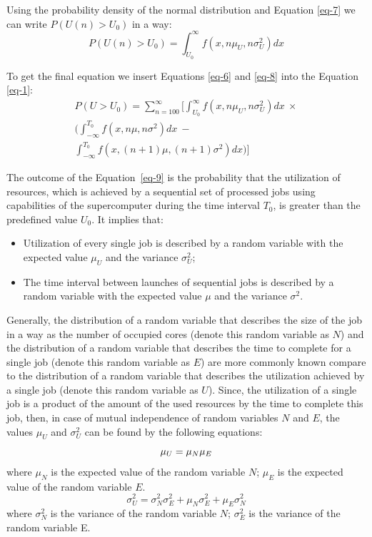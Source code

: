 Using the probability density of the normal distribution and Equation \ref{eq-7} we can write $P(U(n) > U_0)$ in a way:
\begin{equation}
    \label{eq-8}
    P(U(n) > U_0) = \int_{U_0}^{\infty}f(x, n\mu_{U}, n\sigma_{U}^2)dx
\end{equation}

To get the final equation we insert Equations \ref{eq-6} and \ref{eq-8} into the Equation \ref{eq-1}:
\begin{equation}
    \label{eq-9}
    \begin{multlined}
    P(U > U_0) = \sum\limits_{n=100}^{\infty} 
                 \bigg[ \int_{U_0}^{\infty}f(x, n\mu_{U}, n\sigma_{U}^2)dx \  \times \\
                 \bigg( \int_{-\infty}^{T_0}f(x, n\mu, n\sigma^2)dx \  - \\
                 \int_{-\infty}^{T_0}f(x, (n+1)\mu, (n+1)\sigma^2)dx \bigg) \bigg]
    \end{multlined}
\end{equation}

The outcome of the Equation~\ref{eq-9} is the probability that the utilization of resources, which is achieved by a sequential set of processed jobs using capabilities of the supercomputer during the time interval $T_0$, is greater than the predefined value $U_0$. It implies that:
\begin{itemize}
	\item Utilization of every single job is described by a random variable with the expected value $\mu_{U}$ and the variance $\sigma_{U}^2$;
	\item The time interval between launches of sequential jobs is described by a random variable with the expected value $\mu$ and the variance $\sigma^2$.
\end{itemize}

Generally, the distribution of a random variable that describes the size of the job in a way as the number of occupied cores (denote this random variable as $N$) and the distribution of a random variable that describes the time to complete for a single job (denote this random variable as $E$) are more commonly known compare to the distribution of a random variable that describes the utilization achieved by a single job (denote this random variable as $U$). Since, the utilization of a single job is a product of the amount of the used resources by the time to complete this job, then, in case of mutual independence of random variables $N$ and $E$, the values $\mu_U$ and $\sigma_{U}^2$ can be found by the following equations:
\begin{equation}
    \label{eq-10}
    \mu_U = \mu_N \mu_E \\
\end{equation}
where $\mu_N$ is the expected value of the random variable $N$; $\mu_E$ is the expected value of the random variable $E$.
\begin{equation}
    \label{eq-11}
    \sigma_{U}^2 = \sigma_{N}^2 \sigma_{E}^2 + \mu_N \sigma_{E}^2 + \mu_E \sigma_{N}^2
\end{equation}
where $\sigma_{N}^2$ is the variance of the random variable $N$; $\sigma_{E}^2$ is the variance of the random variable E.


